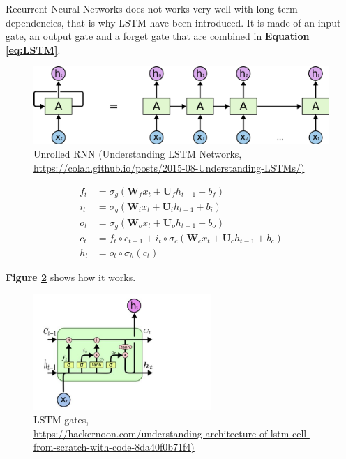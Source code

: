 Recurrent Neural Networks does not works very well with long-term dependencies, that is why LSTM have been introduced. It is made of an input gate, an output gate and a forget gate that are combined in \textbf{Equation \ref{eq:LSTM}}.

\begin{figure}
	\centering
	\includegraphics[width=\textwidth]{images/chapitre4/RNN-unrolled.png}
	\caption{Unrolled RNN (Understanding LSTM Networks, \url{https://colah.github.io/posts/2015-08-Understanding-LSTMs/)}}
	\label{fig:chap4:RNN_unroll}
\end{figure} 

\begin{align} \label{eq:LSTM}
	f_t &= \sigma_g(\mathbf{W}_f x_t + \mathbf{U}_fh_{t-1} + b_f)\\
	i_t &= \sigma_g(\mathbf{W}_i x_t + \mathbf{U}_ih_{t-1} + b_i)\\
	o_t &= \sigma_g(\mathbf{W}_o x_t + \mathbf{U}_oh_{t-1} + b_o)\\
	c_t &= f_t \circ c_{t-1} + i_t \circ \sigma_c(\mathbf{W}_cx_t + \mathbf{U}_c h_{t-1} + b_c)\\
	h_t &= o_t \circ \sigma_h (c_t)
\end{align}

\textbf{Figure \ref{fig:chap4:LSTM-gates}} shows how it works.

\begin{figure}
	\centering
	\includegraphics[width=0.6\textwidth]{images/chapitre4/LSTM1.jpeg}
	\caption{LSTM gates, \\ \url{https://hackernoon.com/understanding-architecture-of-lstm-cell-from-scratch-with-code-8da40f0b71f4)}}
	\label{fig:chap4:LSTM-gates}
\end{figure} 

